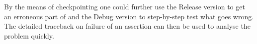By the means of checkpointing one could further use the Release version to get an erroneous
part of \molsturm and the Debug version to step-by-step test what goes wrong.
The detailed traceback on failure of an assertion can then be used to analyse the problem quickly.






